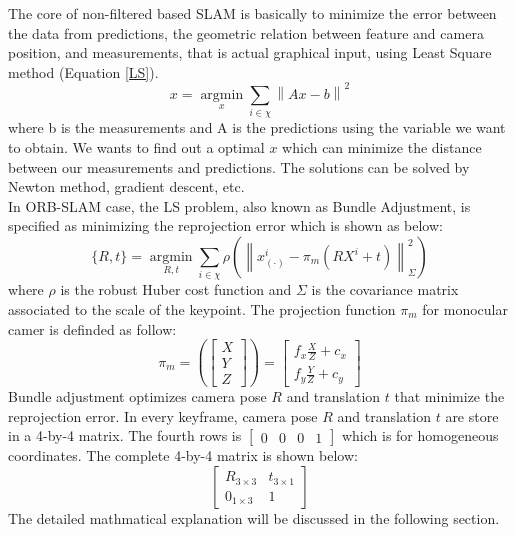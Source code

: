 The core of non-filtered based SLAM is basically to minimize the error between the data from predictions, the geometric relation between feature and camera position, and measurements, that is actual graphical input, using Least Square method (Equation \ref{LS}).
\begin{equation}
    x = \operatorname*{argmin}_x \sum_{i \in \chi}\left\|Ax-b\right\|^2 \label{LS}
\end{equation}
where b is the measurements and A is the predictions using the variable we want to obtain. We wants to find out a optimal $x$ which can minimize the distance between our measurements and predictions. The solutions can be solved by Newton method, gradient descent, etc.\\
In ORB-SLAM case, the LS problem, also known as Bundle Adjustment, is specified as minimizing the reprojection error which is shown as below:
\begin{equation}
    \{R, t\} = \operatorname*{argmin}_{R, t} \sum_{i\in \chi} \rho(\left\|x^i_{(\cdot)}-\pi_{m}(RX^i+t)\right\|^2_\Sigma) \label{motion-only}
\end{equation}
where $\rho$ is the robust Huber cost function and $\Sigma$ is the covariance matrix associated to the scale of the keypoint. The projection function $\pi_m$ for monocular camer is definded as follow:
\begin{equation}
    \pi_m=\left(
    \begin{bmatrix}
        X\\
        Y\\
        Z
    \end{bmatrix} 
    \right)=\begin{bmatrix}
        f_x\frac{X}{Z}+c_x\\
        f_y\frac{Y}{Z}+c_y
    \end{bmatrix}
\end{equation} 
Bundle adjustment optimizes camera pose $R$ and translation $t$ that minimize the reprojection error.
In every keyframe, camera pose $R$ and translation $t$ are store in a 4-by-4 matrix. The fourth rows is 
$
    \begin{bmatrix}
        0 & 0 & 0 &1
    \end{bmatrix}
$
which is for homogeneous coordinates. The complete 4-by-4 matrix is shown below:
$$
    \begin{bmatrix}
        R_{3\times3} & t_{3\times1} \\
        0_{1\times3} & 1
    \end{bmatrix}
$$
The detailed mathmatical explanation will be discussed in the following section.


